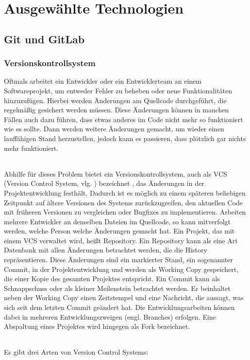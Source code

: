 \chapter{Ausgewählte Technologien}
\section{Git und GitLab}

\subsection{Versionskontrollsystem}
Oftmals arbeitet ein Entwickler oder ein Entwicklerteam an einem Softwareprojekt, um entweder Fehler zu beheben oder neue Funktionalitäten hinzuzufügen. Hierbei werden Änderungen am Quellcode durchgeführt, die regelmäßig gesichert werden müssen. Diese Änderungen können in manchen Fällen auch dazu führen, dass etwas anderes im Code nicht mehr so funktioniert wie es sollte. Dann werden weitere Änderungen gemacht, um wieder einen lauffähigen Stand herzustellen, jedoch kann es passieren, dass plötzlich gar nichts mehr funktioniert.

\mbox{}\\Abhilfe für dieses Problem bietet ein Versionskontrollsystem, auch als VCS (Version Control System, vlg. \cite{vcs_2019}) bezeichnet , das Änderungen in der Projektentwicklung festhält. Dadurch ist es möglich zu einem späteren beliebigen Zeitpunkt auf ältere Versionen des Systems zurückzugreifen, den aktuellen Code mit früheren Versionen zu vergleichen oder Bugfixes zu implementieren. Arbeiten mehrere Entwickler an denselben Dateien im Quellcode, so kann mitverfolgt werden, welche Person welche Änderungen gemacht hat. Ein Projekt, das mit einem VCS verwaltet wird, heißt Repository. Ein Repository kann als eine Art Datenbank mit allen Änderungen betrachtet werden, die die History repräsentieren. Diese Änderungen sind ein markierter Stand, ein sogenannter Commit, in der Projektentwicklung und werden als Working Copy gespeichert, die einer Kopie des gesamten Projektes entspricht. Ein Commit kann als Schnappschuss oder als kleiner Meilenstein betrachtet werden. Er beinhaltet neben der Working Copy einen Zeitstempel und eine Nachricht, die aussagt, was sich seit dem letzten Commit geändert hat. Die Entwicklungsarbeiten können dabei in mehreren Entwicklungszweigen (engl. Branches) erfolgen. Eine Abspaltung eines Projektes wird hingegen als Fork bezeichnet.

\mbox{}\\Es gibt drei Arten von Version Control Systems:

